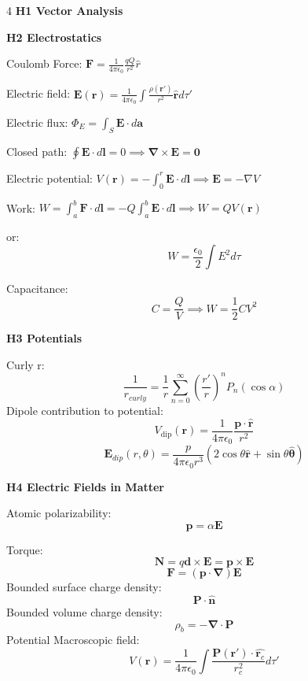 \documentclass[a4paper,twoside]{article}
\newcommand{\secblock}[1]{\vspace{0.08ex}\textbf{#1}\par}
\begin{document}

\begin{multicols*}{4}
\secblock{H1 Vector Analysis}
\secblock{H2 Electrostatics}

Coulomb Force: 
\(\bm F = \frac{1}{4\pi \epsilon_0}\frac{qQ}{r^2}\hat{r}\)

Electric field:
\(
\bm E (\bm r) = \frac{1}{4\pi \epsilon _0} \int \frac{\rho(\bm r ')}{r^2}\hat{\bm r} d\tau'
\)

Electric flux: 
\(
\Phi_E = \int_S \bm E \cdot d\bm a
\)

Closed path:
\(
\oint \bm E \cdot d \bm l = 0 \implies \bm\nabla
 \times \bm E = \bm 0
\)

Electric potential:
\(V(\bm r) =-\int_0^r \bm E \cdot d \bm l \implies \bm E = - \nabla V \)


Work: 
\(W = \int _a^b \bm F \cdot d \bm l = -Q \int _a^b \bm E \cdot d \bm l  \implies W = QV(\bm r)\)

or:
\[
W = \frac{\epsilon_0}{2}\int E^2d\tau
\]


Capacitance:
\[
C = \frac{Q}{V} \implies W = \frac{1}{2}CV^2
\]



\secblock{H3 Potentials}





Curly r:
\[
\frac{1}{r_{curly}} = \frac{1}{r}\sum^\infty_{n=0} (\frac{r'}{r})^n P_n (\cos \alpha)
\]
Dipole contribution to potential:
\[
V_{\text{dip}} (\bm r) = \frac{1}{4 \pi \epsilon_0} \frac{\bm p \cdot \hat{\bm r}}{r^2}
\]
\[
\bm E_{dip}(r,\theta)=\frac{p}{4\pi \epsilon_0 r^3}(2\cos \theta \hat{\bm r} + \sin \theta \hat{\bm \theta})
\]



\secblock{H4 Electric Fields in Matter}

Atomic polarizability:
\[
\bm p = \alpha\bm E
\]

Torque:
\[
\bm N = q \bm d \times \bm E = \bm p \times \bm E
\]
\[
\bm F = (\bm p \cdot \bm \nabla)\bm E
\]
Bounded surface charge density:
\[ \bm P \cdot \hat{\bm n}\]
Bounded volume charge density:
\[
\rho_b = - \bm \nabla \cdot \bm P
\]
Potential Macroscopic field:
\[
V (\bm r) = \frac{1}{4 \pi \epsilon_0} \int \frac{\bm P(\bm r') \cdot \hat{\bm r_{c}}}{r^2_c} d\tau'
\]


\end{multicols*}
\end{document}
